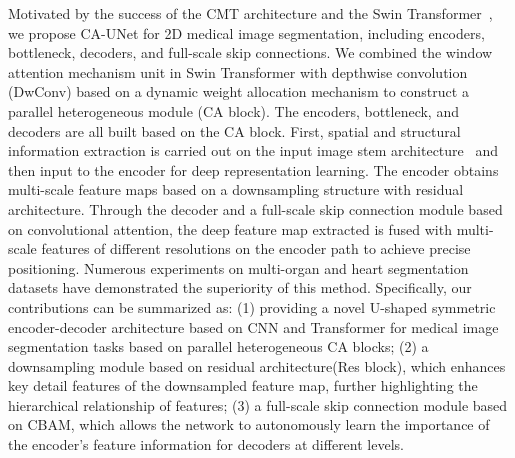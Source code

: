 Motivated by the success of the CMT architecture and the Swin Transformer~\cite{guo2022cmt,liu2021swin}, we propose CA-UNet for 2D medical image segmentation, including encoders, bottleneck, decoders, and full-scale skip connections. We combined the window attention mechanism unit in Swin Transformer with depthwise convolution (DwConv) based on a dynamic weight allocation mechanism to construct a parallel heterogeneous module (CA block). The encoders, bottleneck, and decoders are all built based on the CA block. First, spatial and structural information extraction is carried out on the input image stem architecture~\cite{he2019bag} and then input to the encoder for deep representation learning. The encoder obtains multi-scale feature maps based on a downsampling structure with residual architecture. Through the decoder and a full-scale skip connection module based on convolutional attention, the deep feature map extracted is fused with multi-scale features of different resolutions on the encoder path to achieve precise positioning. Numerous experiments on multi-organ and heart segmentation datasets have demonstrated the superiority of this method. Specifically, our contributions can be summarized as: (1) providing a novel U-shaped symmetric encoder-decoder architecture based on CNN and Transformer for medical image segmentation tasks based on parallel heterogeneous CA blocks; (2) a downsampling module based on residual architecture(Res block), which enhances key detail features of the downsampled feature map, further highlighting the hierarchical relationship of features; (3) a full-scale skip connection module based on CBAM, which allows the network to autonomously learn the importance of the encoder's feature information for decoders at different levels.
